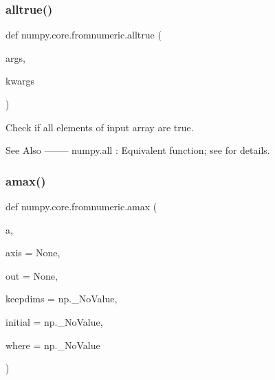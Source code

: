  \mbox{\label{namespacenumpy_1_1core_1_1fromnumeric_a437e5f6dc0351546bb9edf2f7b6ffc70}} 
\subsubsection{\texorpdfstring{alltrue()}{alltrue()}}
{\footnotesize\ttfamily def numpy.\+core.\+fromnumeric.\+alltrue (\begin{DoxyParamCaption}\item[{}]{args,  }\item[{}]{kwargs }\end{DoxyParamCaption})}

\begin{DoxyVerb}Check if all elements of input array are true.

See Also
--------
numpy.all : Equivalent function; see for details.
\end{DoxyVerb}
 \mbox{\label{namespacenumpy_1_1core_1_1fromnumeric_a89dd12e112024ef78428195b5ba5bf7d}} 
\subsubsection{\texorpdfstring{amax()}{amax()}}
{\footnotesize\ttfamily def numpy.\+core.\+fromnumeric.\+amax (\begin{DoxyParamCaption}\item[{}]{a,  }\item[{}]{axis = {\ttfamily None},  }\item[{}]{out = {\ttfamily None},  }\item[{}]{keepdims = {\ttfamily np.\+\_\+NoValue},  }\item[{}]{initial = {\ttfamily np.\+\_\+NoValue},  }\item[{}]{where = {\ttfamily np.\+\_\+NoValue} }\end{DoxyParamCaption})}

